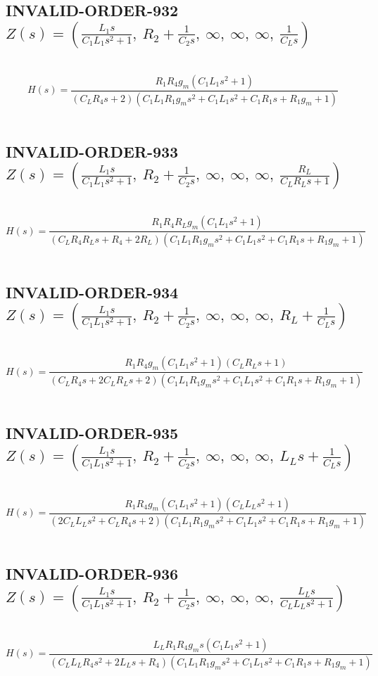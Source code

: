 \documentclass{article}
\begin{document}
\subsection{INVALID-ORDER-932 $Z(s) = \left( \frac{L_{1} s}{C_{1} L_{1} s^{2} + 1}, \  R_{2} + \frac{1}{C_{2} s}, \  \infty, \  \infty, \  \infty, \  \frac{1}{C_{L} s}\right)$ } \ 
\textbf{\[H(s) = \frac{R_{1} R_{4} g_{m} \left(C_{1} L_{1} s^{2} + 1\right)}{\left(C_{L} R_{4} s + 2\right) \left(C_{1} L_{1} R_{1} g_{m} s^{2} + C_{1} L_{1} s^{2} + C_{1} R_{1} s + R_{1} g_{m} + 1\right)}\] } \ 
\subsection{INVALID-ORDER-933 $Z(s) = \left( \frac{L_{1} s}{C_{1} L_{1} s^{2} + 1}, \  R_{2} + \frac{1}{C_{2} s}, \  \infty, \  \infty, \  \infty, \  \frac{R_{L}}{C_{L} R_{L} s + 1}\right)$ } \ 
\textbf{\[H(s) = \frac{R_{1} R_{4} R_{L} g_{m} \left(C_{1} L_{1} s^{2} + 1\right)}{\left(C_{L} R_{4} R_{L} s + R_{4} + 2 R_{L}\right) \left(C_{1} L_{1} R_{1} g_{m} s^{2} + C_{1} L_{1} s^{2} + C_{1} R_{1} s + R_{1} g_{m} + 1\right)}\] } \ 
\subsection{INVALID-ORDER-934 $Z(s) = \left( \frac{L_{1} s}{C_{1} L_{1} s^{2} + 1}, \  R_{2} + \frac{1}{C_{2} s}, \  \infty, \  \infty, \  \infty, \  R_{L} + \frac{1}{C_{L} s}\right)$ } \ 
\textbf{\[H(s) = \frac{R_{1} R_{4} g_{m} \left(C_{1} L_{1} s^{2} + 1\right) \left(C_{L} R_{L} s + 1\right)}{\left(C_{L} R_{4} s + 2 C_{L} R_{L} s + 2\right) \left(C_{1} L_{1} R_{1} g_{m} s^{2} + C_{1} L_{1} s^{2} + C_{1} R_{1} s + R_{1} g_{m} + 1\right)}\] } \ 
\subsection{INVALID-ORDER-935 $Z(s) = \left( \frac{L_{1} s}{C_{1} L_{1} s^{2} + 1}, \  R_{2} + \frac{1}{C_{2} s}, \  \infty, \  \infty, \  \infty, \  L_{L} s + \frac{1}{C_{L} s}\right)$ } \ 
\textbf{\[H(s) = \frac{R_{1} R_{4} g_{m} \left(C_{1} L_{1} s^{2} + 1\right) \left(C_{L} L_{L} s^{2} + 1\right)}{\left(2 C_{L} L_{L} s^{2} + C_{L} R_{4} s + 2\right) \left(C_{1} L_{1} R_{1} g_{m} s^{2} + C_{1} L_{1} s^{2} + C_{1} R_{1} s + R_{1} g_{m} + 1\right)}\] } \ 
\subsection{INVALID-ORDER-936 $Z(s) = \left( \frac{L_{1} s}{C_{1} L_{1} s^{2} + 1}, \  R_{2} + \frac{1}{C_{2} s}, \  \infty, \  \infty, \  \infty, \  \frac{L_{L} s}{C_{L} L_{L} s^{2} + 1}\right)$ } \ 
\textbf{\[H(s) = \frac{L_{L} R_{1} R_{4} g_{m} s \left(C_{1} L_{1} s^{2} + 1\right)}{\left(C_{L} L_{L} R_{4} s^{2} + 2 L_{L} s + R_{4}\right) \left(C_{1} L_{1} R_{1} g_{m} s^{2} + C_{1} L_{1} s^{2} + C_{1} R_{1} s + R_{1} g_{m} + 1\right)}\] } \ 
\end{document}
